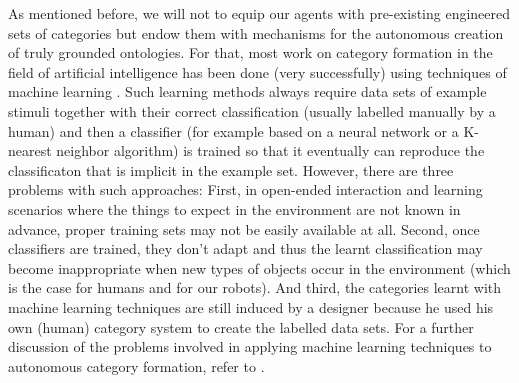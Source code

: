 \noindent As mentioned before, we will not to equip our agents with pre-existing
engineered sets of categories but endow them with mechanisms for the
autonomous creation of truly grounded ontologies. For that, most work
on category formation in the field of artificial intelligence has been
done (very successfully) using techniques of machine learning
\citep{mitchell97machine}. Such learning methods always require data
sets of example stimuli together with their correct classification
(usually labelled manually by a human) and then a classifier (for
example based on a neural network or a K-nearest neighbor algorithm)
is trained so that it eventually can reproduce the classificaton that
is implicit in the example set. However, there are three problems with
such approaches: First, in open-ended interaction and learning
scenarios where the things to expect in the environment are not known
in advance, proper training sets may not be easily available at all.
Second, once classifiers are trained, they don't adapt and thus the
learnt classification may become inappropriate when new types of
objects occur in the environment (which is the case for humans and for
our robots). And third, the categories learnt with machine learning
techniques are still induced by a designer because he used his own
(human) category system to create the labelled data sets. For a
further discussion of the problems involved in applying machine
learning techniques to autonomous category formation, refer to
\citep{steels97constructing}.


